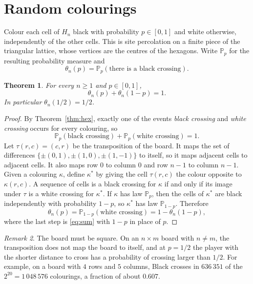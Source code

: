 \documentclass[11pt,a4paper]{amsart}
\newtheorem{theorem}{Theorem}[section]
\theoremstyle{definition}
\theoremstyle{remark}
\newtheorem{remark}[theorem]{Remark}
\newcommand{\Prob}{\mathbb{P}}
\begin{document}
\section{Random colourings}\label{sec:perc}

Colour each cell of $H_n$ black with probability $p \in [0,1]$ and white otherwise, independently of the other cells. This is site percolation on a finite piece of the triangular lattice, whose vertices are the centres of the hexagons. Write $\Prob_p$ for the resulting probability measure and
\[
  \theta_n(p) = \Prob_p(\text{there is a black crossing}).
\]

\begin{theorem}\label{thm:half}
For every $n \ge 1$ and $p \in [0,1]$,
\[
  \theta_n(p) + \theta_n(1-p) = 1 .
\]
In particular $\theta_n(1/2) = 1/2$.
\end{theorem}

\begin{proof}
By Theorem~\ref{thm:hex}, exactly one of the events \emph{black crossing} and \emph{white crossing} occurs for every colouring, so
\begin{equation}\label{eq:sum}
  \Prob_p(\text{black crossing}) + \Prob_p(\text{white crossing}) = 1 .
\end{equation}
Let $\tau(r,c) = (c,r)$ be the transposition of the board. It maps the set of differences $\{\pm(0,1), \pm(1,0), \pm(1,-1)\}$ to itself, so it maps adjacent cells to adjacent cells. It also maps row $0$ to column $0$ and row $n-1$ to column $n-1$. Given a colouring $\kappa$, define $\kappa^*$ by giving the cell $\tau(r,c)$ the colour opposite to $\kappa(r,c)$. A sequence of cells is a black crossing for $\kappa$ if and only if its image under $\tau$ is a white crossing for $\kappa^*$. If $\kappa$ has law $\Prob_p$, then the cells of $\kappa^*$ are black independently with probability $1-p$, so $\kappa^*$ has law $\Prob_{1-p}$. Therefore
\[
  \theta_n(p) = \Prob_{1-p}(\text{white crossing}) = 1 - \theta_n(1-p),
\]
where the last step is \eqref{eq:sum} with $1-p$ in place of $p$.
\end{proof}

\begin{remark}
The board must be square. On an $n \times m$ board with $n \ne m$, the transposition does not map the board to itself, and at $p = 1/2$ the player with the shorter distance to cross has a probability of crossing larger than $1/2$. For example, on a board with $4$ rows and $5$ columns, Black crosses in $636\,351$ of the $2^{20} = 1\,048\,576$ colourings, a fraction of about $0.607$.
\end{remark}
\end{document}
